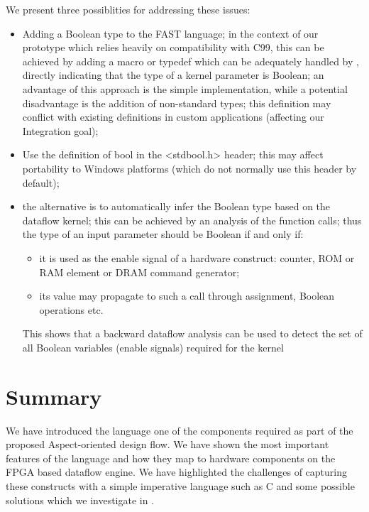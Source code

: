 We present three possiblities for addressing these issues:
\begin{itemize}
\item Adding a Boolean type to the FAST language; in the context of
  our prototype which relies heavily on compatibility with C99, this
  can be achieved by adding a macro or typedef which can be adequately
  handled by \fastc{}, directly indicating that the type of a kernel
  parameter is Boolean; an advantage of this approach is the simple
  implementation, while a potential disadvantage is the addition of
  non-standard types; this definition may  conflict with existing definitions
  in custom applications (affecting our Integration goal);

\item Use the definition of bool in the <stdbool.h> header; this may
  affect portability to Windows platforms (which do not normally use
  this header by default);

\item the alternative is to automatically infer the Boolean type based
  on the dataflow kernel; this can be achieved by an analysis of the
  function calls; thus the type of an input parameter should be
  Boolean if and only if:
  \begin{itemize}
  \item it is used as the enable signal of a hardware construct:
    counter, ROM or RAM element or DRAM command generator;
  \item its value may propagate to such a call through assignment,
    Boolean operations etc.
  \end{itemize}
  This shows that a backward dataflow analysis \cite{aho1977principles}\cite{cooper2011engineering}can be used to
  detect the set of all Boolean variables (enable signals) required
  for the kernel
\end{itemize}



\section{Summary}

We have introduced the \FAST{} language one of the components required
as part of the proposed Aspect-oriented design flow. We have shown the
most important features of the \FAST{} language and how they map to
hardware components on the FPGA based dataflow engine. We have
highlighted the challenges of capturing these constructs with a simple
imperative language such as C and some possible solutions which we
investigate in  .

